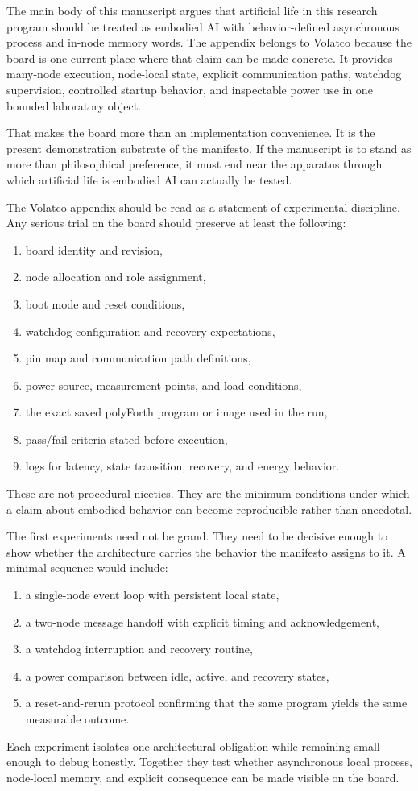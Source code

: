\documentclass[a4paper,english]{article}
\begin{document}
The main body of this manuscript argues that artificial life in this
research program should be treated as embodied AI with behavior-defined
asynchronous process and in-node memory words. The appendix belongs
to Volatco because the board is one current place where that
claim can be made concrete. It provides many-node execution, node-local
state, explicit communication paths, watchdog supervision, controlled
startup behavior, and inspectable power use in one bounded laboratory
object.

That makes the board more than an implementation convenience. It is
the present demonstration substrate of the manifesto. If the manuscript
is to stand as more than philosophical preference, it must end near
the apparatus through which artificial life is embodied AI can actually
be tested.

The Volatco appendix should be read as a statement of experimental
discipline. Any serious trial on the board should preserve at least
the following:
\begin{enumerate}
\item board identity and revision,
\item node allocation and role assignment,
\item boot mode and reset conditions,
\item watchdog configuration and recovery expectations,
\item pin map and communication path definitions,
\item power source, measurement points, and load conditions,
\item the exact saved polyForth program or image used in the run,
\item pass/fail criteria stated before execution,
\item logs for latency, state transition, recovery, and energy behavior.
\end{enumerate}
These are not procedural niceties. They are the minimum conditions
under which a claim about embodied behavior can become reproducible
rather than anecdotal.

The first experiments need not be grand. They need to be decisive
enough to show whether the architecture carries the behavior the manifesto
assigns to it. A minimal sequence would include:
\begin{enumerate}
\item a single-node event loop with persistent local state,
\item a two-node message handoff with explicit timing and acknowledgement,
\item a watchdog interruption and recovery routine,
\item a power comparison between idle, active, and recovery states,
\item a reset-and-rerun protocol confirming that the same program yields
the same measurable outcome.
\end{enumerate}
Each experiment isolates one architectural obligation while remaining
small enough to debug honestly. Together they test whether asynchronous
local process, node-local memory, and explicit consequence can be
made visible on the board.
\end{document}
